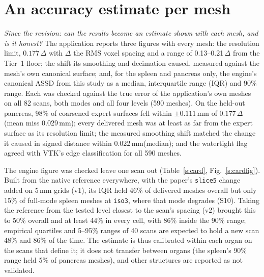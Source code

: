 \documentclass[conference]{IEEEtran}
\newcommand{\lvl}[1]{\texttt{#1}}
\newcommand{\mm}{\,mm\xspace}
\begin{document}
\begin{table}[!t]
\caption{Repeated segmentation against the first run in one persistent GPU process: runs, organ voxels changed and organ Dice (worst run), mesh shift (ASSD to the first run's mesh, max, mm), range of ASSD against the expert surface across repeats of one scan (max, mm), and median seconds per scan.}
\label{s:repeat}
\centering\footnotesize

\end{table}

\section{An accuracy estimate per mesh}
\emph{Since the revision: can the results become an estimate shown with each mesh, and is it honest?} The application reports three figures with every mesh: the resolution limit, $0.177\,\Delta$ with $\Delta$ the RMS voxel spacing and a range of 0.13--0.21\,$\Delta$ from the Tier~1 floor; the shift its smoothing and decimation caused, measured against the mesh's own canonical surface; and, for the spleen and pancreas only, the engine's canonical ASSD from this study as a median, interquartile range (IQR) and 90\% range. Each was checked against the true error of the application's own meshes on all 82 scans, both modes and all four levels (590 meshes). On the held-out pancreas, 98\% of coarsened expert surfaces fell within $\pm0.111$\mm of $0.177\,\Delta$ (mean miss 0.029\mm); every delivered mesh was at least as far from the expert surface as its resolution limit; the measured smoothing shift matched the change it caused in signed distance within 0.022\mm (median); and the watertight flag agreed with VTK's edge classification for all 590 meshes.

The engine figure was checked leave one scan out (Table~\ref{s:card}, Fig.~\ref{s:cardfig}). Built from the native reference everywhere, with the paper's \lvl{slice5} change added on 5\mm grids (v1), its IQR held 46\% of delivered meshes overall but only 15\% of full-mode spleen meshes at \lvl{iso3}, where that mode degrades (S10). Taking the reference from the tested level closest to the scan's spacing (v2) brought this to 50\% overall and at least 44\% in every cell, with 86\% inside the 90\% range; empirical quartiles and 5--95\% ranges of 40 scans are expected to hold a new scan 48\% and 86\% of the time. The estimate is thus calibrated within each organ on the scans that define it; it does not transfer between organs (the spleen's 90\% range held 5\% of pancreas meshes), and other structures are reported as not validated.
\end{document}

